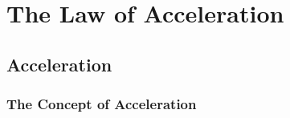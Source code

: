 \documentclass[dvipsnames]{article}
\newif\ifShowUnitIII                             %
\begin{document}











\fi

\clearpage

\section{The Law of Acceleration}

\ifShowUnitIII
\setcounter{example}{0}

\subsection{Acceleration}

\subsubsection{The Concept of Acceleration}
\end{document}
